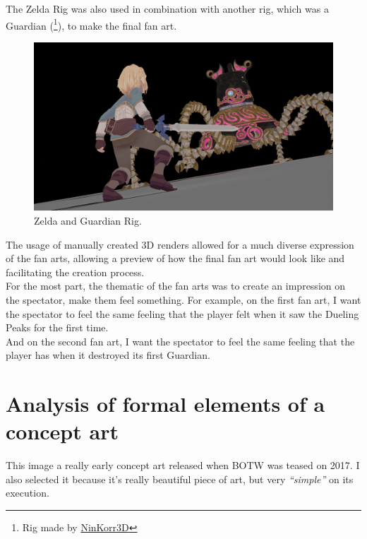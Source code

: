 \documentclass{cup-pan}
\begin{document}
    The Zelda Rig was also used in combination with another rig, which was a Guardian 
    (\footnote{Rig made by 
        \href{https://sketchfab.com/3d-models/guardian-zelda-botw-fan-art-990a6a9434c849329360ea1ef9078895}{NinKorr3D}}), to make the final fan art.
    \begin{figure}[H]
        \includegraphics[width=\textwidth]{Imagenes/Referencias/referencia art 2.png}
        \caption{Zelda and Guardian Rig.}
    \end{figure}

    The usage of manually created 3D renders allowed for a much diverse expression of the fan arts, allowing a preview of how the final fan art would look like and facilitating the creation process.\\

    For the most part, the thematic of the fan arts was to create an impression on the spectator, make them feel something. For example, on the first fan art, I want the spectator to feel the same feeling that the player felt when it saw the Dueling Peaks for the first time. \\

    And on the second fan art, I want the spectator to feel the same feeling that the player has when it destroyed its first Guardian.

\newpage

\section{Analysis of formal elements of a concept art}

    This image a really early concept art released when BOTW was teased on 2017. I also selected it because it's really beautiful piece of art, but very \textit{“simple”} on its execution. 
    
\end{document}
